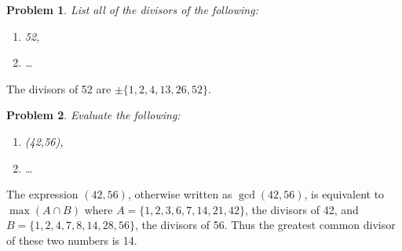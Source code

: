 \documentclass[12pt]{article}
\newtheorem{problem}{Problem}
\theoremstyle{remark}  %
\begin{document}
\setcounter{problem}{11}
    \begin{problem}
        List all of the divisors of the following:
        \begin{enumerate}[label=(\alph*)]
            \item 52,
            \item \dots
        \end{enumerate}
    \end{problem}
    The divisors of 52 are $\pm\{1,2,4,13,26,52\}$.
\vspace{.5em}

\setcounter{problem}{13}
    \begin{problem}
        Evaluate the following:
        \begin{enumerate}[label=(\alph*)]
            \item (42,56),
            \item \dots
        \end{enumerate}
    \end{problem}
    The expression $(42,56)$, otherwise written as $\gcd(42,56)$, is equivalent to $\max(A\cap B)$ where $A=\{1,2,3,6,7,14,21,42\}$, the divisors of 42, and $B=\{1,2,4,7,8,14,28,56\}$, the divisors of 56. Thus the greatest common divisor of these two numbers is 14.
\vspace{.5em}
\end{document}
